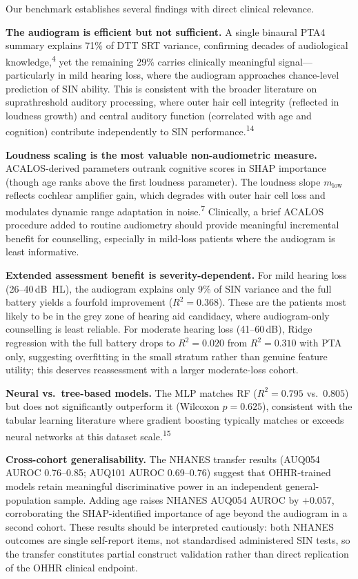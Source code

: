 \documentclass[12pt,a4paper]{article}
\begin{document}
Our benchmark establishes several findings with direct clinical relevance.

\textbf{The audiogram is efficient but not sufficient.}  A single binaural
PTA4 summary explains 71\% of DTT SRT variance, confirming decades of
audiological knowledge,\textsuperscript{4} yet the remaining 29\% carries
clinically meaningful signal---particularly in mild hearing loss, where the
audiogram approaches chance-level prediction of SIN ability.  This is
consistent with the broader literature on suprathreshold auditory processing,
where outer hair cell integrity (reflected in loudness growth) and central
auditory function (correlated with age and cognition) contribute independently
to SIN performance.\textsuperscript{14}

\textbf{Loudness scaling is the most valuable non-audiometric measure.}
ACALOS-derived parameters outrank cognitive scores in SHAP importance (though
age ranks above the first loudness parameter).  The loudness slope
$m_\text{low}$ reflects cochlear amplifier gain, which degrades with outer
hair cell loss and modulates dynamic range adaptation in
noise.\textsuperscript{7}  Clinically, a brief ACALOS procedure added to
routine audiometry should provide meaningful incremental benefit for counselling,
especially in mild-loss patients where the audiogram is least informative.

\textbf{Extended assessment benefit is severity-dependent.}  For mild hearing
loss (26--40\,dB~HL), the audiogram explains only 9\% of SIN variance and
the full battery yields a fourfold improvement ($R^2{=}0.368$).  These are
the patients most likely to be in the grey zone of hearing aid candidacy,
where audiogram-only counselling is least reliable.  For moderate hearing loss
(41--60\,dB), Ridge regression with the full battery drops to $R^2{=}0.020$
from $R^2{=}0.310$ with PTA only, suggesting overfitting in the small stratum
rather than genuine feature utility; this deserves reassessment with a larger
moderate-loss cohort.

\textbf{Neural vs.\ tree-based models.}  The MLP matches RF ($R^2{=}0.795$
vs.\ $0.805$) but does not significantly outperform it (Wilcoxon $p{=}0.625$),
consistent with the tabular learning literature where gradient boosting
typically matches or exceeds neural networks at this dataset
scale.\textsuperscript{15}

\textbf{Cross-cohort generalisability.}  The NHANES transfer results (AUQ054
AUROC 0.76--0.85; AUQ101 AUROC 0.69--0.76) suggest that OHHR-trained models
retain meaningful discriminative power in an independent general-population
sample.  Adding age raises NHANES AUQ054 AUROC by $+0.057$, corroborating
the SHAP-identified importance of age beyond the audiogram in a second cohort.
These results should be interpreted cautiously: both NHANES outcomes are
single self-report items, not standardised administered SIN tests, so the
transfer constitutes partial construct validation rather than direct
replication of the OHHR clinical endpoint.
\end{document}
